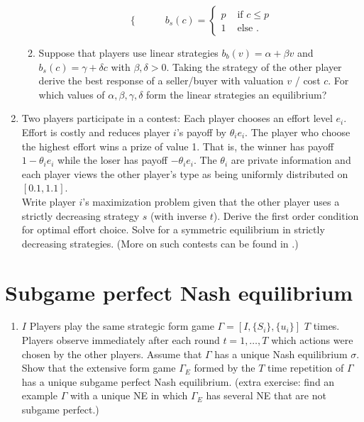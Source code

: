 \documentclass[a4paper,12pt]{article}
\begin{document}
\begin{enumerate}
\begin{enumerate}
\begin{equation*}
\begin{cases}
      \end{cases}
    \qquad
      b_s(c)=
      \begin{cases}
        p & \text{ if }c\leq p\\
        1 & \text{ else }.
      \end{cases}
    \end{equation*}
    \item Suppose that players use linear strategies $b_b(v)=\alpha+\beta v$ and $b_s(c)=\gamma+\delta c$ with $\beta,\delta>0$. Taking the strategy of the other player derive the best response of a seller/buyer with valuation $v$ / cost $c$. For which values of $\alpha,\beta,\gamma,\delta$ form the linear strategies an equilibrium?
    \end{enumerate}
  \item Two players participate in a contest: Each player chooses an effort level $e_i$. Effort is costly and reduces player $i$'s payoff by  $\theta _ie_i$. The player who choose the highest effort wins a prize of value 1. That is, the winner has payoff $1-\theta _i e_i$ while the loser has payoff $-\theta _i e_i$. The $\theta _i$ are private information and each player views the other player's type as being uniformly distributed on $[0.1,1.1]$. \\
    Write player $i$'s maximization problem given that the other player uses a strictly decreasing strategy $s$ (with inverse $t$). Derive the first order condition for optimal effort choice. Solve for a symmetric equilibrium in strictly decreasing strategies.
    (More on such contests can be found in \cite{moldovanu2001optimal}.)
\end{enumerate}

\section{Subgame perfect Nash equilibrium}
\label{sec:subgame-perfect-nash}

\begin{enumerate}
\item $I$ Players play the same strategic form game $\Gamma=[I,\{S_i\},\{u_i\}]$ $T$ times. Players observe immediately after each round $t=1,\dots, T$ which actions were chosen by the other players. Assume that $\Gamma$ has a unique Nash equilibrium $\sigma$. Show that the extensive form game $\Gamma_E$ formed by the $T$ time repetition of $\Gamma$ has a unique subgame perfect Nash equilibrium. (extra exercise: find an example $\Gamma$ with a unique NE in which $\Gamma_E$ has several NE that are not subgame perfect.)
\end{enumerate}
\end{document}
